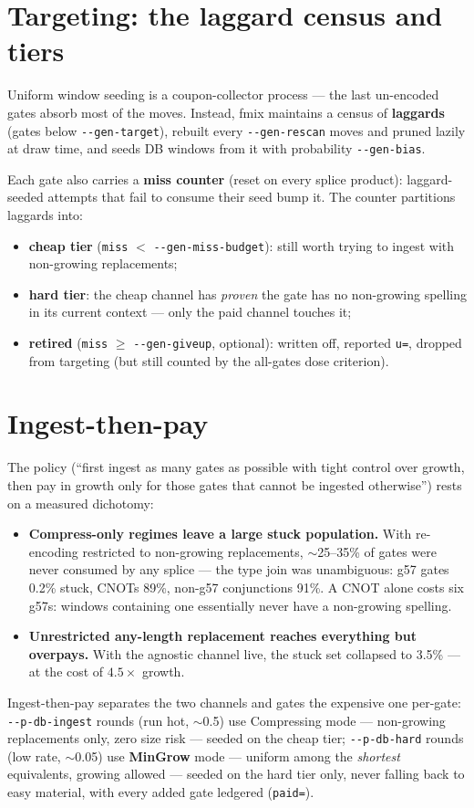 \documentclass[11pt]{article}
\newcommand{\code}[1]{\texttt{#1}}
\begin{document}
\section{Targeting: the laggard census and tiers}
Uniform window seeding is a coupon-collector process --- the last
un-encoded gates absorb most of the moves. Instead, fmix maintains a census
of \textbf{laggards} (gates below \code{-{}-gen-target}), rebuilt every
\code{-{}-gen-rescan} moves and pruned lazily at draw time, and seeds DB
windows from it with probability \code{-{}-gen-bias}.

Each gate also carries a \textbf{miss counter} (reset on every splice
product): laggard-seeded attempts that fail to consume their seed bump it.
The counter partitions laggards into:
\begin{itemize}
\item \textbf{cheap tier} (\code{miss} $<$ \code{-{}-gen-miss-budget}): still
worth trying to ingest with non-growing replacements;
\item \textbf{hard tier}: the cheap channel has \emph{proven} the gate has
no non-growing spelling in its current context --- only the paid channel
touches it;
\item \textbf{retired} (\code{miss} $\geq$ \code{-{}-gen-giveup}, optional):
written off, reported \code{u=}, dropped from targeting (but still counted
by the all-gates dose criterion).
\end{itemize}

\section{Ingest-then-pay}
The policy (``first ingest as many gates as possible with tight control
over growth, then pay in growth only for those gates that cannot be
ingested otherwise'') rests on a measured dichotomy:
\begin{itemize}
\item \textbf{Compress-only regimes leave a large stuck population.} With
re-encoding restricted to non-growing replacements, $\sim$25--35\% of gates
were never consumed by any splice --- the type join was unambiguous: g57
gates 0.2\% stuck, CNOTs 89\%, non-g57 conjunctions 91\%. A CNOT alone
costs six g57s: windows containing one essentially never have a non-growing
spelling.
\item \textbf{Unrestricted any-length replacement reaches everything but
overpays.} With the agnostic channel live, the stuck set collapsed to
3.5\% --- at the cost of $4.5\times$ growth.
\end{itemize}
Ingest-then-pay separates the two channels and gates the expensive one
per-gate: \code{-{}-p-db-ingest} rounds (run hot, $\sim$0.5) use Compressing
mode --- non-growing replacements only, zero size risk --- seeded on the
cheap tier; \code{-{}-p-db-hard} rounds (low rate, $\sim$0.05) use
\textbf{MinGrow} mode --- uniform among the \emph{shortest} equivalents,
growing allowed --- seeded on the hard tier only, never falling back to
easy material, with every added gate ledgered (\code{paid=}).
\end{document}
